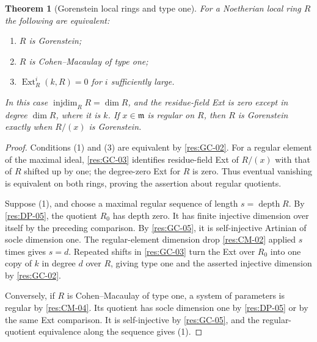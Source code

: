 \documentclass[11pt,oneside,openany]{book}
\newtheorem{theorem}{Theorem}[chapter]
\theoremstyle{definition}
\theoremstyle{remark}
\begin{document}
\begin{theorem}[Gorenstein local rings and type one]\label{res:GC-06}
For a Noetherian local ring $R$ the following are equivalent:
\begin{enumerate}
\item $R$ is Gorenstein;
\item $R$ is Cohen--Macaulay of type one;
\item $\operatorname{Ext}^i_R(k,R)=0$ for $i$ sufficiently large.
\end{enumerate}
In this case $\operatorname{injdim}_R R=\dim R$, and the residue-field
Ext is zero except in degree $\dim R$, where it is $k$.
If $x\in\mathfrak m$ is regular on $R$, then $R$ is Gorenstein
exactly when $R/(x)$ is Gorenstein.
\end{theorem}
\begin{proof}
Conditions (1) and (3) are equivalent by \ref{res:GC-02}.
For a regular element of the maximal ideal, \ref{res:GC-03}
identifies residue-field Ext of $R/(x)$ with that of $R$ shifted
up by one; the degree-zero Ext for $R$ is zero. Thus eventual
vanishing is equivalent on both rings, proving the assertion
about regular quotients.

Suppose (1), and choose a maximal regular sequence of length
$s=\operatorname{depth}R$. By \ref{res:DP-05}, the quotient
$R_0$ has depth zero. It has finite injective dimension over
itself by the preceding comparison. By \ref{res:GC-05}, it is
self-injective Artinian of socle dimension one. The regular-element
dimension drop \ref{res:CM-02} applied $s$ times gives $s=d$.
Repeated shifts in \ref{res:GC-03} turn the Ext over $R_0$
into one copy of $k$ in degree $d$ over $R$, giving type one
and the asserted injective dimension by \ref{res:GC-02}.

Conversely, if $R$ is Cohen--Macaulay of type one, a system of
parameters is regular by \ref{res:CM-04}. Its quotient has socle
dimension one by \ref{res:DP-05} or by the same Ext comparison.
It is self-injective by \ref{res:GC-05}, and the regular-quotient
equivalence along the sequence gives (1).
\end{proof}
\end{document}
